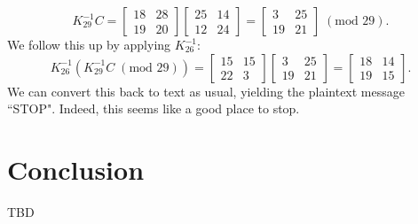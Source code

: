 \documentclass{article}
\begin{document}
\[
    K_{29}^{-1} C = \begin{bmatrix}
        18 & 28 \\
        19 & 20
    \end{bmatrix} \begin{bmatrix}
        25 & 14 \\
        12 & 24
    \end{bmatrix} = \begin{bmatrix}
        3 & 25 \\
        19 & 21
    \end{bmatrix} \; (\text{mod } 29).
\]
We follow this up by applying $K_{26}^{-1}$:
\[
    K_{26}^{-1} (K_{29}^{-1} C \; (\text{mod } 29)) = \begin{bmatrix}
        15 & 15 \\
        22 & 3
    \end{bmatrix} \begin{bmatrix}
        3 & 25 \\
        19 & 21
    \end{bmatrix} = \begin{bmatrix}
        18 & 14 \\
        19 & 15
    \end{bmatrix}.
\]
We can convert this back to text as usual, yielding the plaintext message ``STOP". Indeed, this seems like a good place to stop.

\section{Conclusion}

TBD
\end{document}
